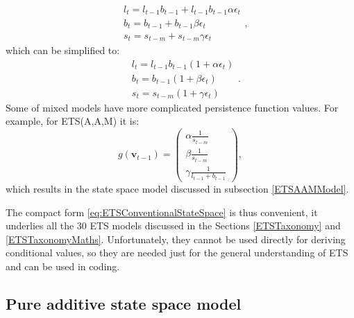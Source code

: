 \documentclass[
]{book}
\theoremstyle{definition}
\theoremstyle{definition}
\theoremstyle{definition}
\theoremstyle{definition}
\theoremstyle{remark}
\begin{document}
\begin{enumerate}
  \begin{equation}
    \begin{aligned}
    & {l}_{t} = l_{t-1} b_{t-1} + l_{t-1} b_{t-1} \alpha\epsilon_t \\
    & b_t = b_{t-1} + b_{t-1} \beta\epsilon_t \\
    & s_t = s_{t-m} + s_{t-m} \gamma\epsilon_t
    \end{aligned},
    \label{eq:ETSMMMTransitionEquation01}
  \end{equation}
  which can be simplified to:
  \begin{equation}
    \begin{aligned}
    & {l}_{t} = l_{t-1}b_{t-1} (1+\alpha\epsilon_t)\\
    & b_t = b_{t-1} (1+\beta\epsilon_t)\\
    & s_t = s_{t-m} (1+\gamma\epsilon_t)
    \end{aligned} .
    \label{eq:ETSMMMTransitionEquation}
  \end{equation}
  Some of mixed models have more complicated persistence function values. For example, for ETS(A,A,M) it is:
  \begin{equation}
    g(\mathbf{v}_{t-1}) =
    \begin{pmatrix}
     \alpha \frac{1}{s_{t-m}} \\
     \beta \frac{1}{s_{t-m}} \\
     \gamma \frac{1}{l_{t-1} + b_{t-1}}
    \end{pmatrix} ,
  \end{equation}
  which results in the state space model discussed in subsection \ref{ETSAAMModel}.
\end{enumerate}

The compact form \eqref{eq:ETSConventionalStateSpace} is thus convenient, it underlies all the 30 ETS models discussed in the Sections \ref{ETSTaxonomy} and \ref{ETSTaxonomyMaths}. Unfortunately, they cannot be used directly for deriving conditional values, so they are needed just for the general understanding of ETS and can be used in coding.

\hypertarget{ETSConventionalModelAdditive}{%
\subsection{Pure additive state space model}\label{ETSConventionalModelAdditive}}
\end{document}
